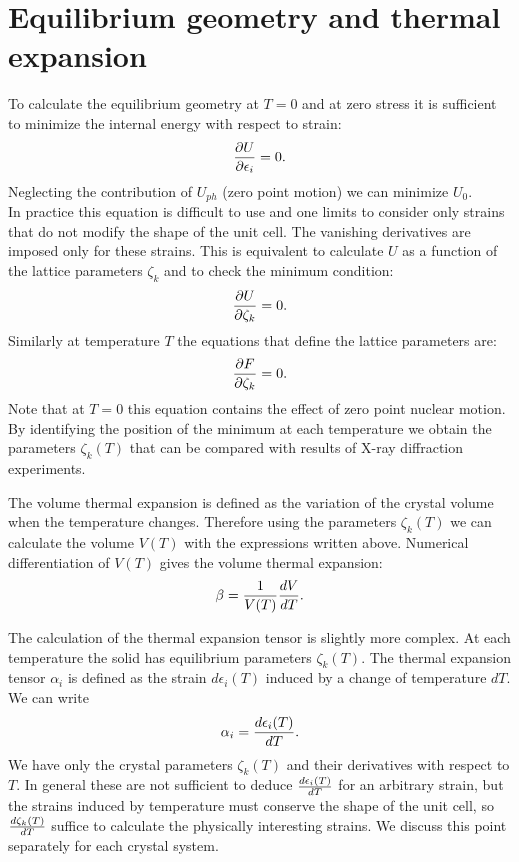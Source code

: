 \documentclass[12pt,a4paper]{article}
\begin{document}
\newpage
\section{\color{coral}Equilibrium geometry and thermal expansion}
To calculate the equilibrium geometry at $T=0$ and at zero stress it
is sufficient to minimize the internal energy with respect to strain:
\begin{equation}
{\partial U \over \partial \epsilon_i}=0.
\end{equation}
Neglecting the contribution of $U_{ph}$ (zero point motion) we can minimize 
$U_0$.\\
In practice this equation is difficult to use and one limits to consider
only strains that do not modify the shape of the unit cell. The
vanishing derivatives are imposed only for these strains.
This is equivalent to calculate $U$ as a function of the lattice parameters 
$\zeta_k$ and to check the minimum condition:
\begin{equation}
{\partial U \over \partial \zeta_k}=0.
\end{equation}
Similarly at temperature $T$ the equations that define the lattice 
parameters are:
\begin{equation}
{\partial F \over \partial \zeta_k}=0.
\end{equation}
Note that at $T=0$ this equation contains the effect of zero point nuclear
motion. By identifying the position of the minimum at each temperature 
we obtain the parameters $\zeta_k (T)$ that can be compared with
results of X-ray diffraction experiments.

The volume thermal expansion is defined as the variation of the crystal
volume when the temperature changes. Therefore using the parameters
$\zeta_k (T)$ we can calculate the volume $V(T)$
with the expressions written above.  
Numerical differentiation of $V(T)$ gives the volume thermal expansion:
\begin{equation}
\beta = {1 \over V(T)} {d V \over d T}.
\end{equation}

The calculation of the thermal expansion tensor is slightly more
complex. At each temperature the solid has equilibrium parameters
$\zeta_k(T)$. The thermal expansion tensor $\alpha_{i}$ is defined 
as the strain $d\epsilon_{i}(T)$ induced by a change of temperature $dT$. 
We can write
\begin{equation}
\alpha_{i} = {d \epsilon_{i}(T) \over  d T }.
\end{equation}
We have only the crystal parameters $\zeta_k (T)$ and their derivatives
with respect to $T$. In general these are not sufficient to deduce 
${d \epsilon_{i}(T) \over  d T }$ for an arbitrary strain, but the strains
induced by temperature must conserve the shape of the unit cell, so
${d \zeta_k (T) \over d T}$ suffice to calculate the physically
interesting strains. We discuss this point separately for each crystal
system.
\end{document}
